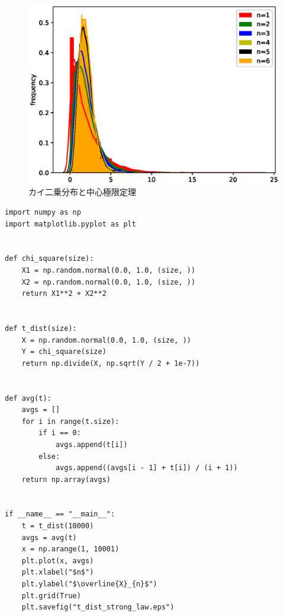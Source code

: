 \documentclass[10pt,a4paper]{ltjsarticle}       %
\begin{document}
\begin{figure}[htbp]
\begin{center}
\includegraphics[clip, scale=0.7]{chi_square_ultimate.eps}
\caption{カイ二乗分布と中心極限定理}
\end{center}
\end{figure}
\clearpage
\begin{lstlisting}
import numpy as np
import matplotlib.pyplot as plt


def chi_square(size):
    X1 = np.random.normal(0.0, 1.0, (size, ))
    X2 = np.random.normal(0.0, 1.0, (size, ))
    return X1**2 + X2**2


def t_dist(size):
    X = np.random.normal(0.0, 1.0, (size, ))
    Y = chi_square(size)
    return np.divide(X, np.sqrt(Y / 2 + 1e-7))


def avg(t):
    avgs = []
    for i in range(t.size):
        if i == 0:
            avgs.append(t[i])
        else:
            avgs.append((avgs[i - 1] + t[i]) / (i + 1))
    return np.array(avgs)


if __name__ == "__main__":
    t = t_dist(10000)
    avgs = avg(t)
    x = np.arange(1, 10001)
    plt.plot(x, avgs)
    plt.xlabel("$n$")
    plt.ylabel("$\overline{X}_{n}$")
    plt.grid(True)
    plt.savefig("t_dist_strong_law.eps")

\end{lstlisting}
\end{document}
